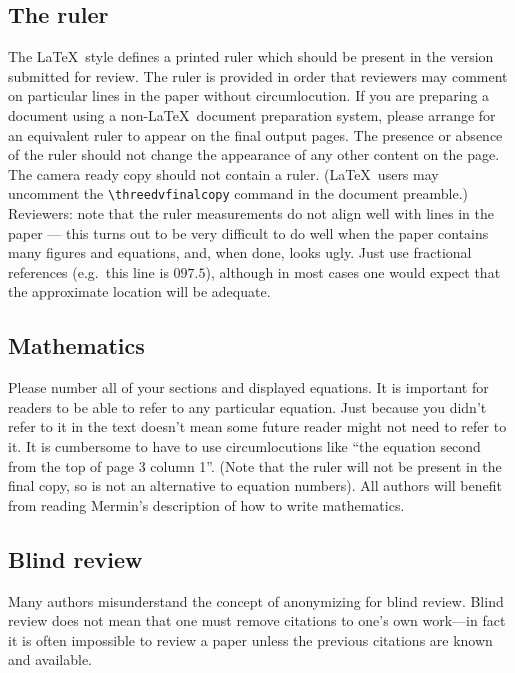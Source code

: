 \documentclass[10pt,twocolumn,letterpaper]{article}
\begin{document}
\subsection{The ruler}
The \LaTeX\ style defines a printed ruler which should be present in the
version submitted for review.  The ruler is provided in order that
reviewers may comment on particular lines in the paper without
circumlocution.  If you are preparing a document using a non-\LaTeX\
document preparation system, please arrange for an equivalent ruler to
appear on the final output pages.  The presence or absence of the ruler
should not change the appearance of any other content on the page.  The
camera ready copy should not contain a ruler. (\LaTeX\ users may uncomment
the \verb'\threedvfinalcopy' command in the document preamble.)  Reviewers:
note that the ruler measurements do not align well with lines in the paper
--- this turns out to be very difficult to do well when the paper contains
many figures and equations, and, when done, looks ugly.  Just use fractional
references (e.g.\ this line is $097.5$), although in most cases one would
expect that the approximate location will be adequate.

\subsection{Mathematics}

Please number all of your sections and displayed equations.  It is
important for readers to be able to refer to any particular equation.  Just
because you didn't refer to it in the text doesn't mean some future reader
might not need to refer to it.  It is cumbersome to have to use
circumlocutions like ``the equation second from the top of page 3 column
1''.  (Note that the ruler will not be present in the final copy, so is not
an alternative to equation numbers).  All authors will benefit from reading
Mermin's description of how to write mathematics.%


\subsection{Blind review}

Many authors misunderstand the concept of anonymizing for blind
review.  Blind review does not mean that one must remove
citations to one's own work---in fact it is often impossible to
review a paper unless the previous citations are known and
available.
\end{document}

